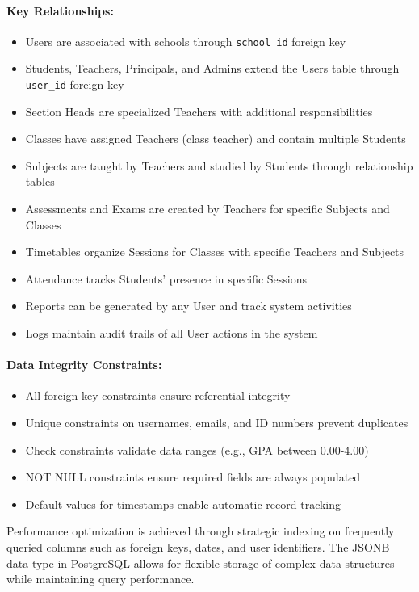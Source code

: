 \documentclass[12pt,a4paper]{report}
\begin{document}
\paragraph{Key Relationships:}
\begin{itemize}
    \item Users are associated with schools through \texttt{school\_id} foreign key
    \item Students, Teachers, Principals, and Admins extend the Users table through \texttt{user\_id} foreign key
    \item Section Heads are specialized Teachers with additional responsibilities
    \item Classes have assigned Teachers (class teacher) and contain multiple Students
    \item Subjects are taught by Teachers and studied by Students through relationship tables
    \item Assessments and Exams are created by Teachers for specific Subjects and Classes
    \item Timetables organize Sessions for Classes with specific Teachers and Subjects
    \item Attendance tracks Students' presence in specific Sessions
    \item Reports can be generated by any User and track system activities
    \item Logs maintain audit trails of all User actions in the system
\end{itemize}

\paragraph{Data Integrity Constraints:}
\begin{itemize}
    \item All foreign key constraints ensure referential integrity
    \item Unique constraints on usernames, emails, and ID numbers prevent duplicates
    \item Check constraints validate data ranges (e.g., GPA between 0.00-4.00)
    \item NOT NULL constraints ensure required fields are always populated
    \item Default values for timestamps enable automatic record tracking
\end{itemize}

Performance optimization is achieved through strategic indexing on frequently queried columns such as foreign keys, dates, and user identifiers. The JSONB data type in PostgreSQL allows for flexible storage of complex data structures while maintaining query performance.
\end{document}
